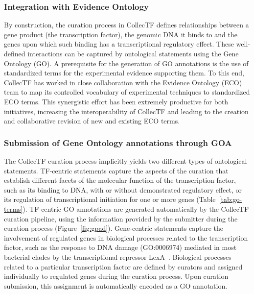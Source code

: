 \subsubsection{Integration with Evidence Ontology}

By construction, the curation process in CollecTF defines relationships between
a gene product (the transcription factor), the genomic DNA it binds to and the
genes upon which such binding has a transcriptional regulatory effect. These
well-defined interactions can be captured by ontological statements using the
Gene Ontology (GO). A prerequisite for the generation of GO
annotations is the use of standardized terms for the experimental evidence
supporting them. To this end, CollecTF has worked in close collaboration with
the Evidence Ontology (ECO) team to map its controlled vocabulary of
experimental techniques to standardized ECO terms. This synergistic effort has
been extremely productive for both initiatives, increasing the interoperability
of CollecTF and leading to the creation and collaborative revision of new and
existing ECO terms.

\subsubsection{Submission of Gene Ontology annotations through GOA}
The CollecTF curation process implicitly yields two different types of
ontological statements. TF-centric statements capture the aspects of the
curation that establish different facets of the molecular function of the
transcription factor, such as its binding to DNA, with or without demonstrated
regulatory effect, or its regulation of transcriptional initiation for one or
more genes (Table~\ref{tab:go-terms}). TF-centric GO annotations are generated
automatically by the CollecTF curation pipeline, using the information provided
by the submitter during the curation process
(Figure~\ref{fig:gpad}). Gene-centric statements capture the involvement of
regulated genes in biological processes related to the transcription factor,
such as the response to DNA damage (GO:0006974) mediated in most bacterial
clades by the transcriptional repressor LexA~\citep{erill2007aeons}. Biological
processes related to a particular transcription factor are defined by curators
and assigned individually to regulated genes during the curation process. Upon
curation submission, this assignment is automatically encoded as a GO
annotation.


